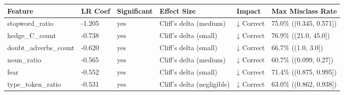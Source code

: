 \begin{tabular}{llllll}
\toprule
Feature & LR Coef & Significant & Effect Size & Impact & Max Misclass Rate \\
\midrule
stopword\_ratio & -1.205 & yes & Cliff's delta (medium) & ↓ Correct & 75.0\% ((0.345, 0.571]) \\
hedge\_C\_count & -0.738 & yes & Cliff's delta (small) & ↓ Correct & 76.9\% ((21.0, 45.0]) \\
doubt\_adverbs\_count & -0.620 & yes & Cliff's delta (small) & ↓ Correct & 66.7\% ((1.0, 3.0]) \\
noun\_ratio & -0.565 & yes & Cliff's delta (medium) & ↓ Correct & 60.7\% ((0.099, 0.27]) \\
fear & -0.552 & yes & Cliff's delta (small) & ↓ Correct & 71.4\% ((0.875, 0.995]) \\
type\_token\_ratio & -0.531 & yes & Cliff's delta (negligible) & ↓ Correct & 63.0\% ((0.862, 0.938]) \\
\bottomrule
\end{tabular}
